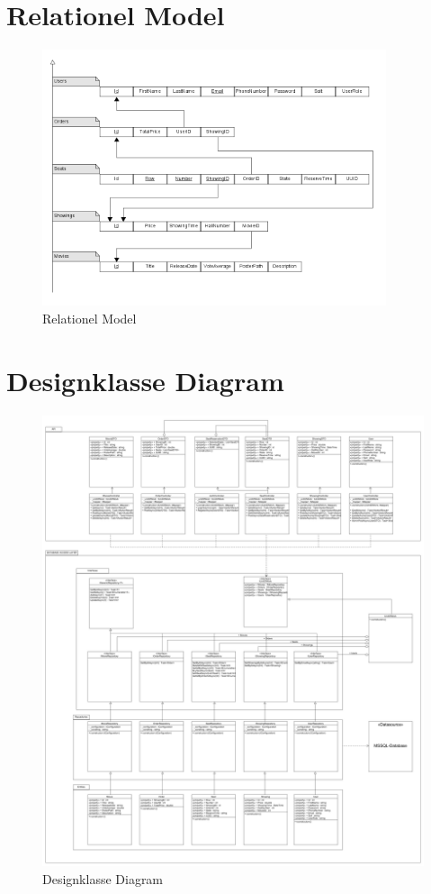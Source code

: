 \chapter{Relationel Model}\label{app:relationelmodel}
\begin{figure}[!h]
    \centering
    \includegraphics[width=0.9\textwidth]{bilag/RelationelModel.png}
    \caption{Relationel Model}
\end{figure}

\chapter{Designklasse Diagram}\label{app:designklassediagram}
\begin{figure}[!h]
    \centering
    \includegraphics[width=\textwidth]{figures/DDNordicBio.png}
    \caption{Designklasse Diagram}
\end{figure}